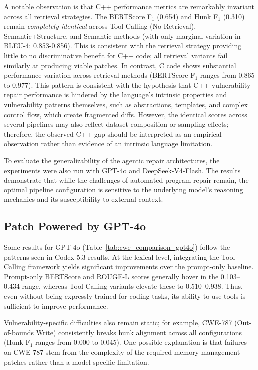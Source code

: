 A notable observation is that C++ performance metrics are remarkably invariant across all retrieval strategies. The BERTScore F$_1$ (0.654) and Hunk F$_1$ (0.310) remain \emph{completely identical} across Tool Calling (No Retrieval), Semantic+Structure, and Semantic methods (with only marginal variation in BLEU-4: 0.853-0.856). 
This is consistent with the retrieval strategy providing little to no discriminative benefit for C++ code; all retrieval variants fail similarly at producing viable patches. 
In contrast, C code shows substantial performance variation across retrieval methods (BERTScore F$_1$ ranges from 0.865 to 0.977). 
This pattern is consistent with the hypothesis that C++ vulnerability repair performance is hindered by the language's intrinsic properties and vulnerability patterns themselves, such as abstractions, templates, and complex control flow, which create fragmented diffs. 
However, the identical scores across several pipelines may also reflect dataset composition or sampling effects; therefore, the observed C++ gap should be interpreted as an empirical observation rather than evidence of an intrinsic language limitation.

To evaluate the generalizability of the agentic repair architectures, the experiments were also run with GPT-4o and DeepSeek-V4-Flash. The results demonstrate that while the challenges of automated program repair remain, the optimal pipeline configuration is sensitive to the underlying model's reasoning mechanics and its susceptibility to external context.

\subsection{Patch Powered by GPT-4o}

Some results for GPT-4o (Table~\ref{tab:cwe_comparison_gpt4o}) follow the patterns seen in Codex-5.3 results. At the lexical level, integrating the Tool Calling framework yields significant improvements over the prompt-only baseline. Prompt-only BERTScore and ROUGE-L scores generally hover in the 0.103–0.434 range, whereas Tool Calling variants elevate these to 0.510–0.938. Thus, even without being expressly trained for coding tasks, its ability to use tools is sufficient to improve performance.

Vulnerability-specific difficulties also remain static; for example, CWE-787 (Out-of-bounds Write) consistently breaks hunk alignment across all configurations (Hunk $\text{F}_1$ ranges from 0.000 to 0.045). One possible explanation is that failures on CWE-787 stem from the complexity of the required memory-management patches rather than a model-specific limitation. 


